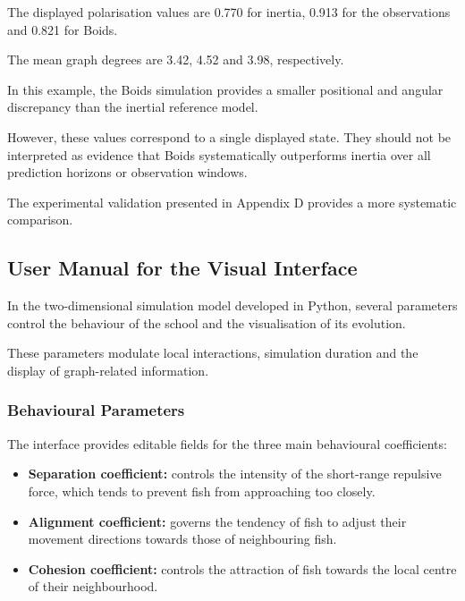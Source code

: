 \documentclass[10pt,a4paper]{article}
\begin{document}
The displayed polarisation values
are 0.770 for inertia,
0.913 for the observations
and 0.821 for Boids.

The mean graph degrees are
3.42, 4.52 and 3.98,
respectively.

In this example, the Boids simulation
provides a smaller positional and
angular discrepancy than the
inertial reference model.

However, these values correspond
to a single displayed state.
They should not be interpreted
as evidence that Boids systematically
outperforms inertia over all
prediction horizons or observation windows.

The experimental validation
presented in Appendix D provides
a more systematic comparison.

\subsection{User Manual for the Visual Interface}

In the two-dimensional simulation model
developed in Python, several parameters
control the behaviour of the school
and the visualisation of its evolution.

These parameters modulate local interactions,
simulation duration and the display
of graph-related information.

\subsubsection*{Behavioural Parameters}

The interface provides editable fields
for the three main behavioural coefficients:

\begin{itemize}

    \item \textbf{Separation coefficient:}
    controls the intensity of the
    short-range repulsive force,
    which tends to prevent fish
    from approaching too closely.

    \item \textbf{Alignment coefficient:}
    governs the tendency of fish
    to adjust their movement directions
    towards those of neighbouring fish.

    \item \textbf{Cohesion coefficient:}
    controls the attraction of fish
    towards the local centre of
    their neighbourhood.

\end{itemize}
\end{document}
